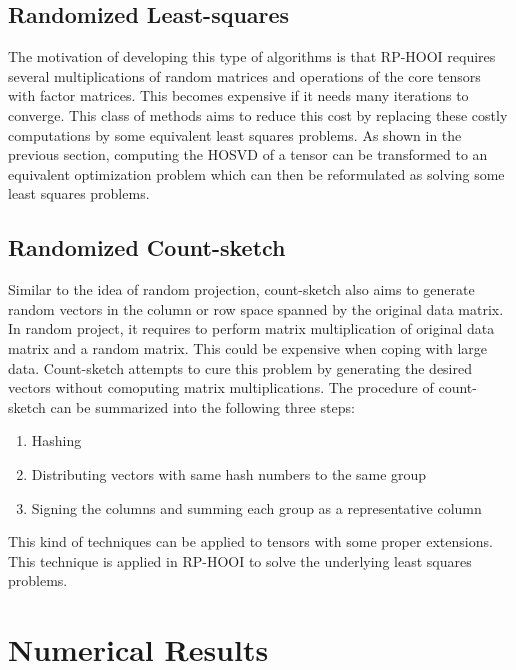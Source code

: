 \documentclass[preprint]{elsarticle}
\begin{document}
\subsection{Randomized Least-squares}
\noindent The motivation of developing this type of algorithms is that RP-HOOI requires several multiplications of random matrices and operations of the core tensors
with factor matrices. This becomes expensive if it needs many iterations to converge. This class of methods aims to reduce this cost by
replacing these costly computations by some equivalent least squares problems. As shown in the previous section, computing the HOSVD of a tensor
can be transformed to an equivalent optimization problem which can then be reformulated as solving some least squares problems.
\subsection{Randomized Count-sketch}
\noindent Similar to the idea of random projection, count-sketch also aims to generate random vectors in the column 
or row space spanned by the original data matrix. In random project, it requires to perform matrix multiplication of original data matrix
and a random matrix. This could be expensive when coping with large data. Count-sketch attempts to cure this problem by generating the desired
vectors without comoputing matrix multiplications. The procedure of count-sketch can be summarized into the
following three steps:
\begin{enumerate}
    \item Hashing
    \item Distributing vectors with same hash numbers to the same group
    \item Signing the columns and summing each group as a representative column
\end{enumerate}
This kind of techniques can be applied to tensors with some proper extensions. This technique is applied in RP-HOOI
to solve the underlying least squares problems.

\section{Numerical Results}
\end{document}
